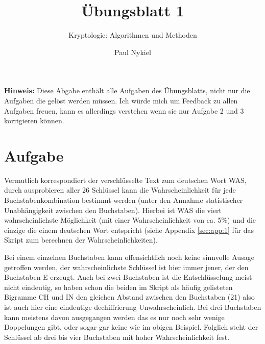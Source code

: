 \documentclass[DIN, pagenumber=false, fontsize=11pt, parskip=half]{scrartcl}
\title{Übungsblatt 1}
\subtitle{Kryptologie: Algorithmen und Methoden}
\author{Paul Nykiel}
\begin{document}
    \maketitle
    \textbf{Hinweis: } Diese Abgabe enthält alle Aufgaben des Übungsblatts, nicht
    nur die Aufgaben die gelöst werden müssen. Ich würde mich um Feedback zu allen
    Aufgaben freuen, kann es allerdings verstehen wenn sie nur Aufgabe 2 und 3 korrigieren
    können.
    
    \section{Aufgabe}
    Vermutlich korrespondiert der verschlüsselte Text zum deutschen Wort \glqq{}WAS\grqq{},
    durch ausprobieren aller 26 Schlüssel kann die Wahrscheinlichkeit für jede
    Buchstabenkombination bestimmt werden (unter den Annahme statistischer Unabhängigkeit zwischen den Buchstaben). 
    Hierbei ist \glqq{}WAS\grqq{} die viert wahrscheinlichste Möglichkeit (mit einer Wahrscheinlichkeit von ca. 5\%) und die einzige die einem deutschen Wort entspricht (siehe Appendix \ref{sec:app:1} für das Skript zum berechnen der Wahrscheinlichkeiten).

    Bei einem einzelnen Buchstaben kann offensichtlich noch keine sinnvolle Ausage getroffen werden, der wahrscheinlichste Schlüssel ist hier immer jener, der den Buchstaben \glqq{}E\grqq{} erzeugt. 
    Auch bei zwei Buchstaben ist die Entschlüsselung meist nicht eindeutig, so haben schon die beiden im Skript als häufig gelisteten Bigramme \glqq{}CH\grqq{} und \glqq{}IN\grqq{} den gleichen Abstand zwischen den Buchstaben (21) also ist auch hier eine eindeutige dechiffrierung Unwahrscheinlich.
    Bei drei Buchstaben kann meistens davon ausgegangen werden das es nur noch sehr wenige Doppelungen gibt, oder sogar gar keine wie im obigen Beispiel.
    Folglich steht der Schlüssel ab drei bis vier Buchstaben mit hoher Wahrscheinlichkeit fest.
\end{document}
